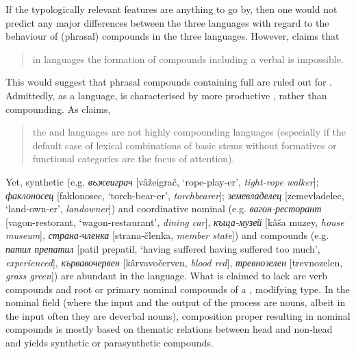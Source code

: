 \documentclass[output=paper]{LSP/langsci}
\begin{document}
\largerpage[-1]
If the typologically relevant features are anything to go by, then one would not predict any major differences between the three languages with regard to the behaviour of (phrasal) compounds in the three languages. However, \citet[1824]{Ohnheiser2015} claims that

\begin{quotation}
in  languages the formation of compounds including a verbal  is impossible. 
\end{quotation}

This would suggest that phrasal compounds containing full  are ruled out for . Admittedly, as a  language,  is characterised by more productive , rather than compounding. As \citet[911]{Olsen2015} claims, 


\begin{quotation}
the  and  languages are not highly compounding languages (especially if the default case of lexical combinations of basic stems without formatives or functional categories are the focus of attention). 
\end{quotation}

Yet, synthetic (e.g. \textit{{въжеиграч}} [vâžeigrač, ‘rope-play-er’, \textit{tight-rope walker}]; \textit{{факлоносец} }[faklonosec, ‘torch-bear-er’, \textit{torchbearer}]; \textit{{земевладелец} }[zemevladelec, ‘land-own-er’, \textit{landowner}]) and coordinative nominal (e.g. \textit{{вагон-ресто\-рант} }[vagon-restorant, ‘wagon-restaurant’, \textit{dining car}], \textit{{къща-музей}} [kâša mu\-zey,  \textit{house museum}], \textit{{страна-членка} }[strana-členka, \textit{member state}]) and  compounds (e.g. \textit{{патил препатил}} [patil prepatil, ‘having suffered having suffered too much’, \textit{experienced}], \textit{{кървавочервен}} [kârvavočerven,  \textit{blood red}], \textit{{тревнозелен}} [trevnozelen, \textit{grass green}]) are abundant in the language. What  is claimed to lack are verb compounds and root or primary nominal compounds of a , modifying type. In the nominal field (where the input and the output of the process are nouns, albeit in the input often they are deverbal nouns), composition proper resulting in nominal compounds is mostly based on thematic relations between head and non-head and yields synthetic or parasynthetic compounds. 
\end{document}
